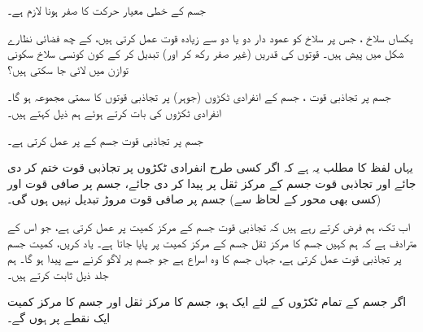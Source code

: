 جسم کے  خطی معیار حرکت   کا صفر ہونا لازم ہے۔

یکساں سلاخ ، جس پر سلاخ کو عمود دار دو یا دو سے زیادہ قوت عمل کرتی ہیں،  کے چھ فضائی نظارے شکل  میں پیش ہیں۔ قوتوں کی قدریں      (غیر صفر رکھ کر اور)   تبدیل کر کے  کون کونسی سلاخ سکونی توازن میں لائی جا سکتی ہیں؟

جسم پر تجاذبی قوت  ، جسم کے انفرادی ٹکڑوں (جوہر) پر تجاذبی قوتوں کا سمتی مجموعہ ہو گا۔ انفرادی ٹکڑوں کی بات کرتے ہوئے ہم ذیل کہتے ہیں۔

جسم پر تجاذبی قوت     جسم کے  پر    عمل کرتی ہے۔

یہاں لفظ  کا مطلب یہ ہے کہ  اگر کسی طرح انفرادی ٹکڑوں  پر تجاذبی قوت ختم کر دی جائے اور تجاذبی قوت   جسم کے مرکز ثقل پر پیدا کر دی جائے، جسم پر صافی قوت اور  (کسی بھی محور کے لحاظ سے)  جسم پر صافی قوت مروڑ تبدیل نہیں ہوں گی۔

اب تک،  ہم فرض کرتے رہے ہیں کہ تجاذبی قوت   جسم کے مرکز کمیت پر عمل کرتی ہے، جو   اس  کے  مترادف  ہے  کہ ہم کہیں جسم کا مرکز ثقل  جسم کے مرکز کمیت  پر پایا جاتا ہے۔ یاد  کریں، کمیت    جسم پر تجاذبی  قوت      عمل کرتی ہے، جہاں    جسم کا وہ اسراع ہے جو جسم پر  لاگو کرنے سے پیدا ہو گا۔ ہم  جلد  ذیل  ثابت کرتے ہیں۔

اگر جسم کے تمام ٹکڑوں کے لئے   ایک ہو، جسم کا مرکز ثقل اور جسم کا مرکز کمیت ایک نقطے پر ہوں گے۔
